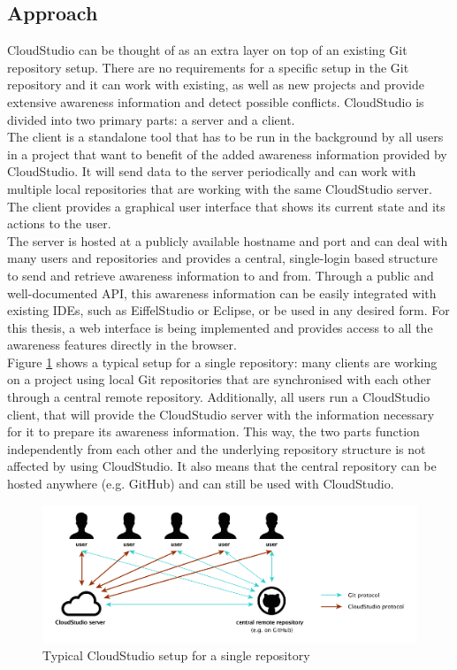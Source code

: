 \subsection{Approach}\label{designapproach}


CloudStudio can be thought of as an extra layer on top of an existing Git repository setup. There are no requirements for a specific setup in the Git repository and it can work with existing, as well as new projects and provide extensive awareness information and detect possible conflicts. CloudStudio is divided into two primary parts: a server and a client. \\

The client is a standalone tool that has to be run in the background by all users in a project that want to benefit of the added awareness information provided by CloudStudio. It will send data to the server periodically and can work with multiple local repositories that are working with the same CloudStudio server. The client provides a graphical user interface that shows its current state and its actions to the user. \\

The server is hosted at a publicly available hostname and port and can deal with many users and repositories and provides a central, single-login based structure to send and retrieve awareness information to and from. Through a public and well-documented API, this awareness information can be easily integrated with existing IDEs, such as EiffelStudio \cite{eiffelstudio} or Eclipse, or be used in any desired form. For this thesis, a web interface is being implemented and provides access to all the awareness features directly in the browser. \\

Figure \ref{fig:generalsetup} shows a typical setup for a single repository: many clients are working on a project using local Git repositories that are synchronised with each other through a central remote repository. Additionally, all users run a CloudStudio client, that will provide the CloudStudio server with the information necessary for it to prepare its awareness information. This way, the two parts function independently from each other and the underlying repository structure is not affected by using CloudStudio. It also means that the central repository can be hosted anywhere (e.g. GitHub) and can still be used with CloudStudio. \\

\begin{figure}[h!]
  \centering
      \includegraphics[width=1\textwidth]{generalsetup}
  \caption{Typical CloudStudio setup for a single repository}
  \label{fig:generalsetup}
\end{figure}

